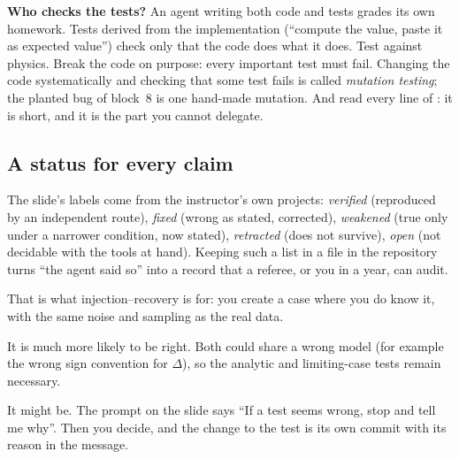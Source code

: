 \textbf{Who checks the tests?} An agent writing both code and tests grades its own
homework. Tests derived from the implementation (``compute the value, paste it as
expected value'') check only that the code does what it does. Test against physics.
Break the code on purpose: every important test must fail. Changing the code
systematically and checking that some test fails is called \emph{mutation testing}; the
planted bug of block~8 is one hand-made mutation. And read every line of :
it is short, and it is the part you cannot delegate.

\subsection{A status for every claim}

The slide's labels come from the instructor's own projects: \emph{verified} (reproduced
by an independent route), \emph{fixed} (wrong as stated, corrected), \emph{weakened}
(true only under a narrower condition, now stated), \emph{retracted} (does not survive),
\emph{open} (not decidable with the tools at hand). Keeping such a list in a file in the
repository turns ``the agent said so'' into a record that a referee, or you in a year,
can audit.

\begin{qa}
That is what injection--recovery is for: you create a case where you do know it, with
the same noise and sampling as the real data.

It is much more likely to be right. Both could share a wrong model (for example the wrong
sign convention for $\Delta$), so the analytic and limiting-case tests remain necessary.

It might be. The prompt on the slide says ``If a test seems wrong, stop and tell me why''.
Then you decide, and the change to the test is its own commit with its reason in the
message.
\end{qa}
